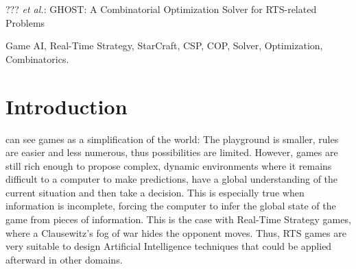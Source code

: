 \documentclass[journal]{IEEEtran}
\newcommand{\ghost}{\textsc{GHOST}\xspace}
\begin{document}
%
{??? \MakeLowercase{\textit{et al.}}: \ghost: A Combinatorial Optimization Solver for RTS-related Problems}

\maketitle

\begin{abstract}
  This paper presents \ghost, a combinatorial optimization solver that
  an  RTS AI  developer can  use as  a blackbox  to solve  any problem
  encoded into a constraint satisfaction/optimization problem. We show
  how to model  three very different RTS problems,  each one belonging
  to   a   specific   level    of   abstraction,   by   a   constraint
  satisfaction/optimization problem and test our solver on them, using
  StarCraft as  a testbed. For  the three problems, \ghost  shows very
  good results computed within some tens of milliseconds.
\end{abstract}

\begin{IEEEkeywords}
Game   AI,   Real-Time   Strategy,  StarCraft,   CSP,   COP,   Solver,
Optimization, Combinatorics.
\end{IEEEkeywords}

%
\IEEEpeerreviewmaketitle

\section{Introduction}\label{sec:intro}

 can see games  as a simplification of the world:
The playground  is smaller, rules  are easier and less  numerous, thus
possibilities are  limited. However,  games are  still rich  enough to
propose complex, dynamic environments where  it remains difficult to a
computer  to make  predictions,  have a  global  understanding of  the
current situation  and then take  a decision. This is  especially true
when  information is  incomplete, forcing  the computer  to infer  the
global state of the game from  pieces of information. This is the case
with Real-Time Strategy  games, where a Clausewitz's fog  of war hides
the  opponent moves.   Thus, RTS  games  are very  suitable to  design
Artificial Intelligence techniques that  could be applied afterward in
other domains.
\end{document}
